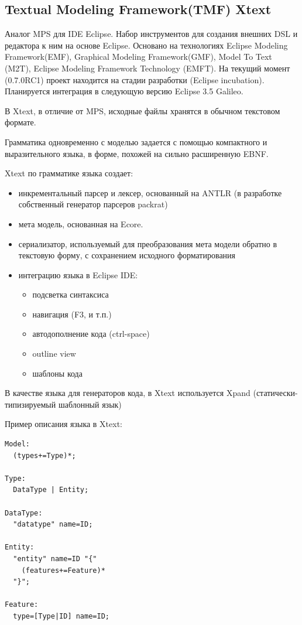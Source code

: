 \documentclass[a4paper,12pt]{article}
\begin{document}
\subsection{Textual Modeling Framework(TMF) Xtext}
Аналог MPS для IDE Eclipse.
Набор инструментов для создания внешних DSL и редактора к ним на основе Eclipse.
Основано на технологиях Eclipse Modeling Framework(EMF), Graphical Modeling
Framework(GMF), Model To Text (M2T), Eclipse Modeling Framework Technology
(EMFT). На текущий момент (0.7.0RC1) проект находится на стадии разработки
(Eclipse incubation). Планируется интеграция в следующую версию Eclipse 3.5
Galileo.

В Xtext, в отличие от MPS, исходные файлы хранятся в обычном текстовом формате.

Грамматика одновременно с моделью задается с помощью компактного и
выразительного языка, в форме, похожей на сильно расширенную EBNF.

Xtext по грамматике языка создает:
\begin{itemize}
  \item инкрементальный парсер и лексер, основанный на ANTLR (в разработке
  собственный генератор парсеров packrat)
  \item мета модель, основанная на Ecore.
  \item сериализатор, используемый для преобразования мета модели обратно в
  текстовую форму, с сохранением исходного форматирования 
  \item интеграцию языка в Eclipse IDE:
  \begin{itemize}
    \item подсветка синтаксиса
    \item навигация (F3, и т.п.)
    \item автодополнение кода (ctrl-space)
    \item outline view
    \item шаблоны кода
  \end{itemize}
\end{itemize}

В качестве языка для генераторов кода, в Xtext используется Xpand
(статически-типизируемый шаблонный язык)

\begin{example}
Пример описания языка в Xtext:
\end{example}
\begin{verbatim}
Model:
  (types+=Type)*;

Type:
  DataType | Entity;

DataType:
  "datatype" name=ID;

Entity:
  "entity" name=ID "{"
    (features+=Feature)* 
  "}";

Feature:
  type=[Type|ID] name=ID;   
\end{verbatim}
\end{document}
